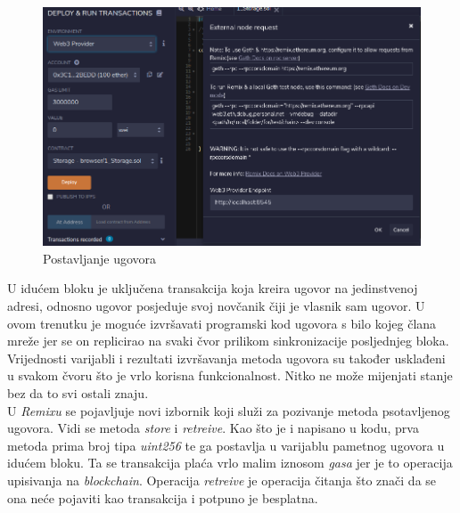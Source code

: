 \documentclass[times, utf8, zavrsni, numeric]{fer}
\begin{document}
\begin{figure}[ht]
  \includegraphics[width=\textwidth]{remixconnect.png}
  \caption{Postavljanje ugovora}
  \centering
  \vfill
\end{figure}

U idućem bloku je uključena transakcija koja kreira ugovor na jedinstvenoj adresi, odnosno ugovor posjeduje svoj novčanik čiji je vlasnik sam ugovor. 
U ovom trenutku je moguće izvršavati programski kod ugovora s bilo kojeg člana mreže jer se on replicirao na svaki čvor prilikom sinkronizacije posljednjeg bloka.
Vrijednosti varijabli i rezultati izvršavanja metoda ugovora su također usklađeni u svakom čvoru što je vrlo korisna funkcionalnost. Nitko ne može mijenjati stanje
bez da to svi ostali znaju. \\
U \emph{Remixu} se pojavljuje novi izbornik koji služi za pozivanje metoda psotavljenog ugovora. Vidi se metoda \emph{store} i \emph{retreive}. Kao što je i napisano
u kodu, prva metoda prima broj tipa \emph{uint256} te ga postavlja u varijablu pametnog ugovora u idućem bloku. Ta se transakcija plaća vrlo malim iznosom \emph{gasa}
jer je to operacija upisivanja na \emph{blockchain}. Operacija \emph{retreive} je operacija čitanja što znači da se ona neće pojaviti kao transakcija i potpuno je 
besplatna. 

\pagebreak
\end{document}

